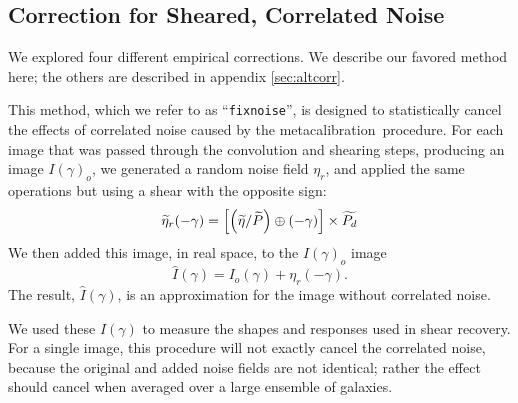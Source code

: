\documentclass[iop]{emulateapj}
\newcommand{\mcal}{metacalibration}
\newcommand{\ntil}{\mbox{$\widetilde{\eta}$}}
\newcommand{\Ptil}{\mbox{$\widetilde{P}$}}
\newcommand{\Ptild}{\mbox{$\widetilde{P_d}$}}
\newcommand{\fixnoise}{\texttt{fixnoise}}
\begin{document}


\subsection{Correction for Sheared, Correlated Noise} \label{sec:fixnoise}


We explored four different empirical corrections.  We describe our favored
method here; the others are described in appendix \ref{sec:altcorr}.

This method, which we refer to as ``\fixnoise'', is designed to statistically
cancel the effects of correlated noise caused by the \mcal\ procedure.  For each
image that was passed through the convolution and shearing steps, producing
an image $I(\gamma)_o$, we generated a random noise field
$\eta_r$, and applied the same operations but using a shear with
the opposite sign:
\begin{equation}
    \widetilde{\eta}_r(-\gamma) = \left[ \left( \ntil/\Ptil \right) \oplus (-\gamma) \right] \times \Ptild  \nonumber \\
\end{equation}
We then added this image, in real space, to the $I(\gamma)_o$ image
\begin{equation}
    \hat{I}(\gamma) = I_o(\gamma) + \eta_r(-\gamma).
\end{equation}
The result, $\hat{I}(\gamma)$, is an approximation for the image
without correlated noise.

We used these $\hat{I}(\gamma)$ to measure the shapes and responses used in
shear recovery.  For a single image, this procedure will not exactly cancel the
correlated noise, because the original and added noise fields are not
identical; rather the effect should cancel when averaged over a large ensemble
of galaxies.
\end{document}
